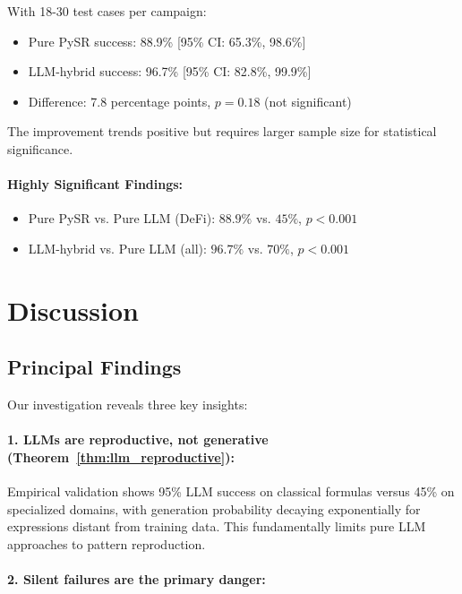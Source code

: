 \documentclass[twoside,11pt]{article}
\begin{document}
With 18-30 test cases per campaign:

\begin{itemize}
\item Pure PySR success: 88.9\% [95\% CI: 65.3\%, 98.6\%]
\item LLM-hybrid success: 96.7\% [95\% CI: 82.8\%, 99.9\%]
\item Difference: 7.8 percentage points, $p = 0.18$ (not significant)
\end{itemize}

The improvement trends positive but requires larger sample size for statistical significance.

\paragraph{Highly Significant Findings:}
\begin{itemize}
\item Pure PySR vs. Pure LLM (DeFi): $88.9\%$ vs. $45\%$, $p < 0.001$
\item LLM-hybrid vs. Pure LLM (all): $96.7\%$ vs. $70\%$, $p < 0.001$
\end{itemize}

\section{Discussion}
\label{sec:discussion}

\subsection{Principal Findings}

Our investigation reveals three key insights:

\paragraph{1. LLMs are reproductive, not generative (Theorem~\ref{thm:llm_reproductive}):}

Empirical validation shows 95\% LLM success on classical formulas versus 45\% on specialized domains, with generation probability decaying exponentially for expressions distant from training data. This fundamentally limits pure LLM approaches to pattern reproduction.

\paragraph{2. Silent failures are the primary danger:}
\end{document}
